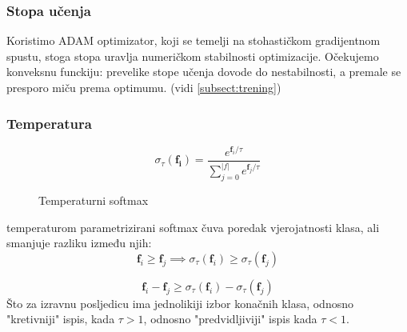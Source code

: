 \documentclass[conference]{IEEEtran}
\begin{document}
\subsubsection{Stopa učenja}
Koristimo ADAM optimizator, koji se temelji na stohastičkom gradijentnom spustu, stoga stopa uravlja numeričkom stabilnosti optimizacije. Očekujemo konveksnu funckiju: prevelike stope učenja dovode do nestabilnosti, a premale se presporo miču prema optimumu. (vidi \ref{subsect:trening})

\subsubsection{Temperatura}
\begin{figure}[H]
\begin{equation}
\sigma_{\tau}(\mathbf{f_i}) = \frac{e^{\mathbf{f}_i/\tau}}{\sum_{j=0}^{\lvert f \rvert} e^{\mathbf{f}_j/\tau} }
\end{equation}
\caption{Temperaturni softmax}
\end{figure}

temperaturom parametrizirani softmax čuva poredak vjerojatnosti klasa, ali smanjuje razliku između njih:
\begin{equation}
\mathbf{f}_i \geq \mathbf{f}_j \implies \sigma_{\tau}(\mathbf{f}_i) \geq \sigma_{\tau}(\mathbf{f}_j)
\end{equation}

\begin{equation}
\mathbf{f}_i - \mathbf{f}_j \geq \sigma_{\tau}(\mathbf{f}_i) - 
 \sigma_{\tau}(\mathbf{f}_j)
\end{equation}
Što za izravnu posljedicu ima jednolikiji izbor konačnih klasa, odnosno "kretivniji" ispis, kada $\tau > 1$, odnosno "predvidljiviji" ispis kada $\tau < 1$.
\end{document}
